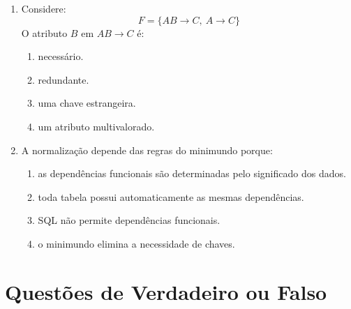 \documentclass[12pt,a4paper]{article}
\begin{document}
\begin{enumerate}[label=\textbf{Q\arabic*.}]
\item Considere:
\[
F = \{AB \rightarrow C,\ A \rightarrow C\}
\]
O atributo $B$ em $AB \rightarrow C$ é:

\begin{enumerate}[label=\alph*)]
    \item necessário.
    \item redundante.
    \item uma chave estrangeira.
    \item um atributo multivalorado.
\end{enumerate}

\item A normalização depende das regras do minimundo porque:

\begin{enumerate}[label=\alph*)]
    \item as dependências funcionais são determinadas pelo significado dos dados.
    \item toda tabela possui automaticamente as mesmas dependências.
    \item SQL não permite dependências funcionais.
    \item o minimundo elimina a necessidade de chaves.
\end{enumerate}

\end{enumerate}

\section{Questões de Verdadeiro ou Falso}
\end{document}
